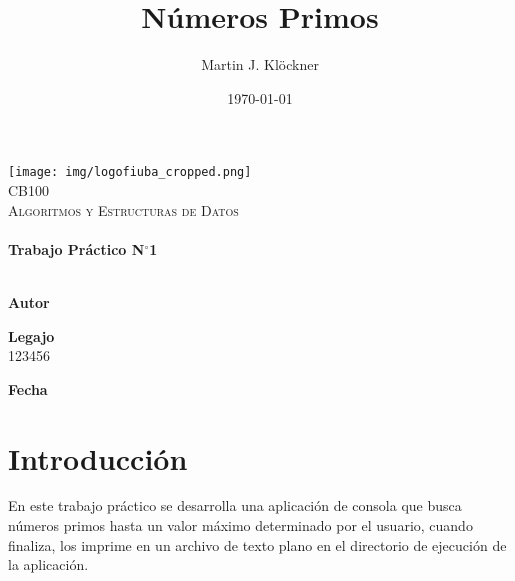 \documentclass[12pt]{article}
\title{Números Primos}          %
\author{Martin J. Klöckner}     %
\date{\today}                   %
\makeatletter
\newcommand{\padron}{123456}    %
\newcommand{\tpnumber}{1}       %
\let\thetitle\@title
\let\theauthor\@author
\let\thedate\@date
\makeatother
\begin{document}
\begin{titlepage}
    \vspace*{-2.5cm}
    {\centering
    \texttt{[image: img/logofiuba\_cropped.png]}\\[2.25 cm]}
    \centering
    \textsc{\Large CB100}\\[0.2 cm]
    \textsc{\large Algoritmos y Estructuras de Datos}\\[4 cm]
    \textcolor{cyan}{{\fontsize{40}{60}\selectfont \bfseries \thetitle}}\\[0.5cm]
    {\Large \bfseries Trabajo Práctico N$^\circ$\tpnumber}\\[5cm]


    \vfill
    \noindent\makebox[\linewidth]{\rule{\textwidth}{0.4pt}}\\[0.5cm]
    \begin{minipage}{.46\textwidth}
    \textbf{Autor}\\
    \theauthor
    \end{minipage}%
    \begin{minipage}{.34\textwidth}
    \textbf{Legajo}\\
    \padron
    \end{minipage}%
    \begin{minipage}{.2\textwidth}
     \begin{flushright}
        \textbf{Fecha}\\
        \thedate
    \end{flushright}
    \end{minipage}
\end{titlepage}


{
    \hypersetup{linkcolor=black} %
    \tableofcontents
    \pagebreak
}


\section{Introducción}

En este trabajo práctico se desarrolla una aplicación de consola que busca
números primos hasta un valor máximo determinado por el usuario, cuando
finaliza, los imprime en un archivo de texto plano en el directorio de ejecución
de la aplicación.
\end{document}
